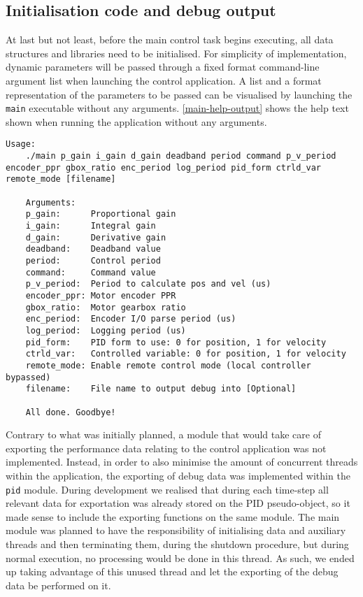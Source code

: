 \subsection{Initialisation code and debug output}
At last but not least, before the main control task begins executing, all data structures and libraries need to be initialised.
For simplicity of implementation, dynamic parameters will be passed through a fixed format command-line argument list when launching the control application.
A list and a format representation of the parameters to be passed can be visualised by launching the \verb|main| executable without any arguments.
\autoref{main-help-output} shows the help text shown when running the application without any arguments.

\begin{lstlisting}[float=htp,breaklines=true,caption=Output showing the help information,label=main-help-output]
	Usage:
	./main p_gain i_gain d_gain deadband period command p_v_period encoder_ppr gbox_ratio enc_period log_period pid_form ctrld_var remote_mode [filename]
	
	Arguments:
	p_gain:      Proportional gain
	i_gain:      Integral gain
	d_gain:      Derivative gain
	deadband:    Deadband value
	period:      Control period
	command:     Command value
	p_v_period:  Period to calculate pos and vel (us)
	encoder_ppr: Motor encoder PPR
	gbox_ratio:  Motor gearbox ratio
	enc_period:  Encoder I/O parse period (us)
	log_period:  Logging period (us)
	pid_form:    PID form to use: 0 for position, 1 for velocity
	ctrld_var:   Controlled variable: 0 for position, 1 for velocity
	remote_mode: Enable remote control mode (local controller bypassed)
	filename:    File name to output debug into [Optional]
	
	All done. Goodbye!
\end{lstlisting}

Contrary to what was initially planned, a module that would take care of exporting the performance data relating to the control application was not implemented.
Instead, in order to also minimise the amount of concurrent threads within the application, the exporting of debug data was implemented within the \verb|pid| module.
During development we realised that during each time-step all relevant data for exportation was already stored on the PID pseudo-object, so it made sense to include the exporting functions on the same module.
The main module was planned to have the responsibility of initialising data and auxiliary threads and then terminating them, during the shutdown procedure, but during normal execution, no processing would be done in this thread.
As such, we ended up taking advantage of this unused thread and let the exporting of the debug data be performed on it.

